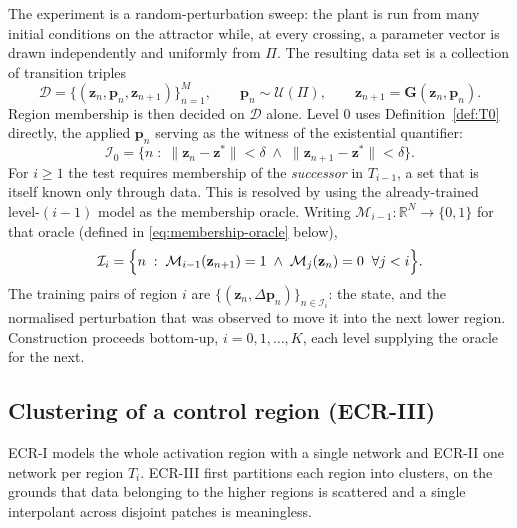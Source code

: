 The experiment is a random-perturbation sweep: the plant is run from many
initial conditions on the attractor while, at every crossing, a parameter
vector is drawn independently and uniformly from $\Pi$. The resulting data set
is a collection of transition triples
%
\begin{equation}
\mathcal{D}=\bigl\{(\mathbf{z}_n,\mathbf{p}_n,\mathbf{z}_{n+1})\bigr\}_{n=1}^{M},
\qquad \mathbf{p}_n\sim\mathcal{U}(\Pi),
\qquad \mathbf{z}_{n+1}=\mathbf{G}(\mathbf{z}_n,\mathbf{p}_n).
\label{eq:dataset}
\end{equation}
%
Region membership is then decided on $\mathcal{D}$ alone. Level $0$ uses
Definition~\ref{def:T0} directly, the applied $\mathbf{p}_n$ serving as the
witness of the existential quantifier:
%
\begin{equation}
\mathcal{I}_0=\bigl\{n\;:\;\|\mathbf{z}_n-\mathbf{z}^{*}\|<\delta
\;\wedge\;\|\mathbf{z}_{n+1}-\mathbf{z}^{*}\|<\delta\bigr\}.
\label{eq:index-T0}
\end{equation}
%
For $i\ge 1$ the test requires membership of the \emph{successor} in $T_{i-1}$,
a set that is itself known only through data. This is resolved by using the
already-trained level-$(i-1)$ model as the membership oracle. Writing
$\mathcal{M}_{i-1}:\mathbb{R}^{N}\to\{0,1\}$ for that oracle (defined in
\eqref{eq:membership-oracle} below),
%
\begin{equation}
\mathcal{I}_i=\Bigl\{n\;:\;\mathcal{M}_{i-1}(\mathbf{z}_{n+1})=1
\;\wedge\;\mathcal{M}_{j}(\mathbf{z}_{n})=0 \;\;\forall j<i \Bigr\}.
\label{eq:index-Ti}
\end{equation}
%
The training pairs of region $i$ are $\{(\mathbf{z}_n,\Delta\mathbf{p}_n)\}_{n\in\mathcal{I}_i}$:
the state, and the normalised perturbation that was observed to move it into
the next lower region. Construction proceeds bottom-up, $i=0,1,\dots,K$, each
level supplying the oracle for the next.

\subsection{Clustering of a control region (ECR-III)}
\label{subsec:ecr-clustering}

ECR-I models the whole activation region with a single network and ECR-II one
network per region $T_i$. ECR-III first partitions each region into clusters,
on the grounds that data belonging to the higher regions is scattered and a
single interpolant across disjoint patches is meaningless.

